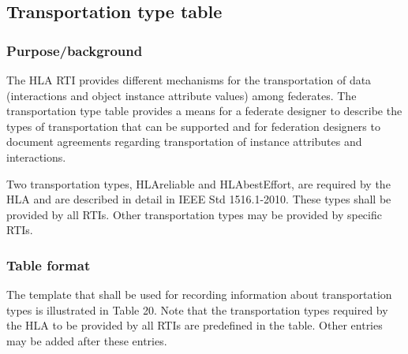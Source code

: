 \vspace{-2pt}

\subsection{Transportation type table}
\vspace{-10pt}

\subsubsection{Purpose/background}
The HLA RTI provides different mechanisms for the transportation of data (interactions and object instance attribute values) among federates. The transportation type table provides a means for a federate designer to describe the types of transportation that can be supported and for federation designers to document agreements regarding transportation of instance attributes and interactions.

Two transportation types, HLAreliable and HLAbestEffort, are required by the HLA and are described in detail in IEEE Std 1516.1-2010. These types shall be provided by all RTIs. Other transportation types may be provided by specific RTIs.

\vspace{-6.5pt}

\subsubsection{Table format}
The template that shall be used for recording information about transportation types is illustrated in Table 20. Note that the transportation types required by the HLA to be provided by all RTIs are predefined in the table. Other entries may be added after these entries.

